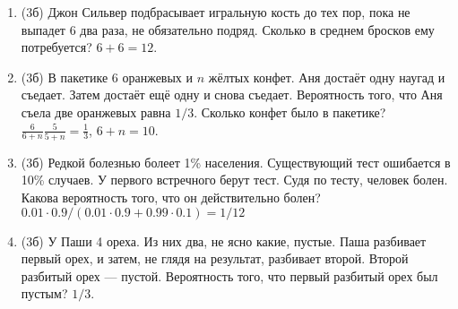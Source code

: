 \documentclass[a4paper, 12pt]{article}
\begin{document}
\begin{enumerate}[resume]
\item (3б) Джон Сильвер подбрасывает игральную кость до тех пор, пока не выпадет 6 два раза, не обязательно подряд. Сколько в среднем бросков ему потребуется? $6+6=12$.
\item (3б) В пакетике 6 оранжевых и $n$ жёлтых конфет. Аня достаёт одну наугад и съедает. Затем достаёт ещё одну и снова съедает. Вероятность того, что Аня съела две оранжевых равна $1/3$. Сколько конфет было в пакетике? $\frac{6}{6+n}\frac{5}{5+n}=\frac{1}{3}$, $6+n=10$.
\item (3б) Редкой болезнью болеет 1\% населения. Существующий тест ошибается в 10\% случаев. У первого встречного берут тест. Судя по тесту, человек болен. Какова вероятность того, что он действительно болен? $0.01\cdot 0.9/(0.01 \cdot 0.9 + 0.99 \cdot 0.1)=1/12$
\item (3б) У Паши 4 ореха. Из них два, не ясно какие, пустые. Паша разбивает первый орех, и затем, не глядя на результат, разбивает второй. Второй разбитый орех — пустой. Вероятность того, что первый разбитый орех был пустым? $1/3$.
\end{enumerate}
\end{document}
